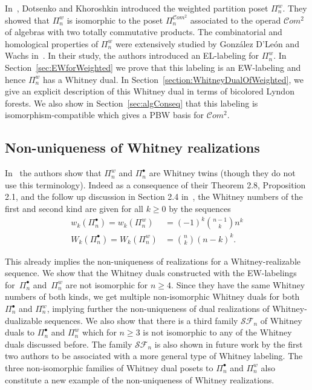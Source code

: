 \documentclass[11pt]{article}
\theoremstyle{definition}
\numberwithin{equation}{section}
\newcommand{\Com}{\mathcal{C}om}
\newcommand{\SF}{\mathcal{SF}}
\begin{document}
  In~\cite{DotsenkoKhoroshkin2007}, Dotsenko and Khoroshkin introduced the weighted partition poset $\Pi_n^w$. They  showed that $\Pi_n^w$ is isomorphic to the poset $\Pi_n^{\Com^2}$ associated to the operad $\Com^2$ of algebras with two totally commutative products.  The combinatorial and homological properties of $\Pi_n^w$ were extensively studied by Gonz\'alez D'Le\'on and Wachs in~\cite{GonzalezDleonWachs2016}. In their study, the authors introduced an EL-labeling for $\Pi_n^w$. In Section~\ref{sec:EWforWeighted} we prove that this labeling is an EW-labeling and hence $\Pi_n^w$ has a Whitney dual.   In Section~\ref{section:WhitneyDualOfWeighted}, we give an explicit description of this Whitney dual in terms of bicolored Lyndon forests.  We also show in Section~\ref{sec:algConseq} that this labeling is isomorphism-compatible which gives a PBW basis for $\Com^2$.
  
  \subsection{Non-uniqueness of Whitney realizations}
  In~\cite[Section 2.4]{GonzalezDleonWachs2016} the authors show that $\Pi_n^w$ and $\Pi_n^{\bullet}$ are Whitney twins (though they do not use this terminology). Indeed as a consequence of their Theorem 2.8, Proposition 2.1, and the follow up discussion in Section 2.4 in~\cite{GonzalezDleonWachs2016},  the Whitney numbers of the first and second kind are given for all $k\ge 0$ by the sequences
  \begin{align*}
w_k(\Pi_n^{\bullet})=w_k(\Pi_n^{w})&=(-1)^{k}\binom{n-1}{k}n^{k}\\
W_k(\Pi_n^{\bullet})=W_k(\Pi_n^{w})&=\binom{n}{k}(n-k)^{k}.
  \end{align*}

  
  
  
  This already implies the non-uniqueness of realizations for a Whitney-realizable sequence. We show that the Whitney duals constructed with the EW-labelings for~$\Pi_n^\bullet$ and~$\Pi_n^w$ are not isomorphic for $n\geq 4$.  Since they have the same Whitney numbers of both kinds, we get multiple non-isomorphic Whitney duals for both $\Pi_n^\bullet$ and $\Pi_n^w$, implying further the non-uniqueness of dual realizations of Whitney-dualizable sequences. We also show that there is a third family $\SF_n$ of Whitney duals to $\Pi_n^\bullet$ and $\Pi_n^w$ which for $n\ge 3$ is not isomorphic to any of the Whitney duals discussed before. The family  $\SF_n$ is also shown in future work by the first two authors to be associated with a more general type of Whitney labeling. The three non-isomorphic families of Whitney dual posets to $\Pi_n^\bullet$ and $\Pi_n^w$ also constitute a new example of the non-uniqueness of Whitney realizations.
\end{document}
